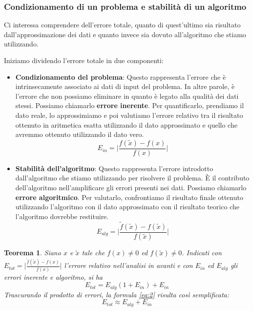 \documentclass{article}
\newtheorem*{theorem}{\color{green}\textbf{Teorema}}
\begin{document}
\subsubsection{Condizionamento di un problema e stabilità di un algoritmo}

Ci interessa comprendere dell'errore totale, quanto di
quest'ultimo sia risultato dall'approssimazione dei dati e quanto invece sia
dovuto all'algoritmo che stiamo utilizzando.

Iniziamo dividendo l'errore totale in due componenti:
\begin{itemize}
    \item \textbf{Condizionamento del problema}: Questo rappresenta l'errore
        che è intrinsecamente associato ai dati di input del problema. In altre
        parole, è l'errore che non possiamo eliminare in quanto è legato alla
        qualità dei dati stessi. Possiamo chiamarlo \textbf{errore inerente}.
        Per quantificarlo, prendiamo il dato reale, lo approssimiamo e poi
        valutiamo l'errore relativo tra il risultato ottenuto in aritmetica esatta  
        utilizzando il  dato approssimato e quello che avremmo ottenuto utilizzando il dato
        vero.
        $$E_{in}=\Big\lvert \frac{f(\tilde{x})-f(x)}{f(x)}\Big\rvert$$
    \item \textbf{Stabilità dell'algoritmo}: Questo rappresenta l'errore
        introdotto dall'algoritmo che stiamo utilizzando per risolvere il
        problema. È il contributo dell'algoritmo nell'amplificare gli errori
        presenti nei dati. Possiamo chiamarlo \textbf{errore algoritmico}. Per
        valutarlo, confrontiamo il risultato finale ottenuto utilizzando
        l'algoritmo con il dato approssimato con il risultato teorico che
        l'algoritmo dovrebbe restituire.
        $$E_{alg}=\Big\lvert
        \frac{\tilde{f}(\tilde{x})-f(\tilde{x})}{f(\tilde{x})} \Big\rvert$$
\end{itemize}
\begin{theorem}
    Siano $x$ e $\tilde{x}$ tale che $f(x)\neq0$ ed $f(\tilde{x})\neq0$.
    Indicati con $E_{tot}=\Big\lvert
    \frac{\tilde{f}(\tilde{x})-f(x)}{f(x)}\Big\rvert$ l'errore relativo 
    nell'analisi in avanti e con
    $E_{in}$ ed $E_{alg}$ gli errori inerente e algoritmo, si ha 
    \begin{equation} \label{eq:2}
        E_{tot}=E_{alg}(1+E_{in})+E_{in}
    \end{equation}
    Trascurando il prodotto di errori, la formula \ref{eq:2} risulta così semplificata:
    {\color{green}$$E_{tot}\approx E_{alg}+E_{in}$$}
\end{theorem}
\end{document}
